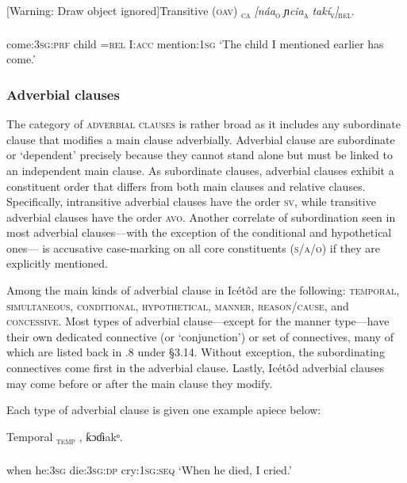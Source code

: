 [Warning: Draw object ignored]Transitive (\textsc{oav})
\ea\label{ex:}
\textsc{\textsubscript{ca}}\textit{   [náa}\textsc{\textsubscript{o}}\textit{   ɲcia}\textsc{\textsubscript{a}}\textit{   takí}\textsc{\textsubscript{v}}\textit{]}\textsc{\textsubscript{rel}}. \\
    \\
come:\textsc{3sg}:\textsc{prf}   child   =\textsc{rel}   I:\textsc{acc}   mention:\textsc{1sg}
\glt ‘The child I mentioned earlier has come.’ 
\z




\subsubsection{Adverbial clauses}

The category of \textsc{adverbial clauses} is rather broad as it includes any subordinate clause that modifies a main clause adverbially. Adverbial clause are subordinate or ‘dependent’ precisely because they cannot stand alone but must be linked to an independent main clause. As subordinate clauses, adverbial clauses exhibit a constituent order that differs from both main clauses and relative clauses. Specifically, intransitive adverbial clauses have the order \textsc{sv}, while transitive adverbial clauses have the order \textsc{avo}. Another correlate of subordination seen in most adverbial clauses—with the exception of the conditional and hypothetical ones— is accusative case-marking on all core constituents (\textsc{s/a/o}) if they are explicitly mentioned. 

Among the main kinds of adverbial clause in Icétôd are the following: \textsc{temporal}, \textsc{simultaneous}, \textsc{conditional}, \textsc{hypothetical}, \textsc{manner}, \textsc{reason}/\textsc{cause}, and \textsc{concessive}. Most types of adverbial clause—except for the manner type—have their own dedicated connective (or ‘conjunction’) or set of connectives, many of which are listed back in .8 under §3.14. Without exception, the subordinating connectives come first in the adverbial clause. Lastly, Icétôd adverbial clauses may come before or after the main clause they modify. 

Each type of adverbial clause is given one example apiece below:




Temporal
\ea\label{ex:}
\textsc{\textsubscript{temp}} ,   ƙɔɗɨakᵒ. \\
    \\
when   he:\textsc{3sg}   die:\textsc{3sg:dp}     cry:\textsc{1sg:seq}
\glt ‘When he died, I cried.’ 
\z




